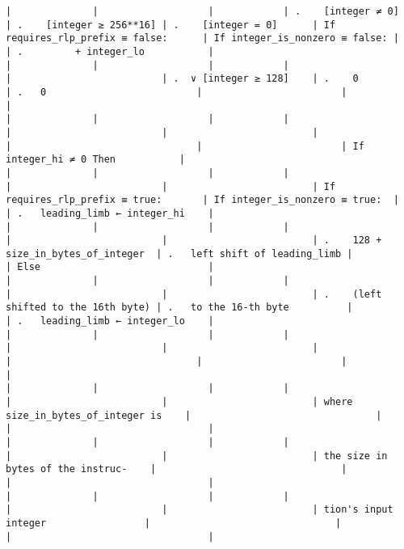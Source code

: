 \documentclass[varwidth=\maxdimen,margin=0.5cm,multi={verbatim}]{standalone}
\begin{document}
\begin{verbatim}
|              |                   |            | .    [integer ≠ 0]      | .    [integer ≥ 256**16] | .    [integer = 0]      | If requires_rlp_prefix ≡ false:      | If integer_is_nonzero ≡ false: |                        | .         + integer_lo           |
|              |                   |            |                         |                          | .  ∨ [integer ≥ 128]    | .    0                               | .   0                          |                        |                                  |
|              |                   |            |                         |                          |                         |                                      |                                |                        | If integer_hi ≠ 0 Then           |
|              |                   |            |                         |                          |                         | If requires_rlp_prefix ≡ true:       | If integer_is_nonzero ≡ true:  |                        | .   leading_limb ← integer_hi    |
|              |                   |            |                         |                          |                         | .    128 + size_in_bytes_of_integer  | .   left shift of leading_limb |                        | Else                             |
|              |                   |            |                         |                          |                         | .    (left shifted to the 16th byte) | .   to the 16-th byte          |                        | .   leading_limb ← integer_lo    |
|              |                   |            |                         |                          |                         |                                      |                                |                        |                                  |
|              |                   |            |                         |                          |                         | where size_in_bytes_of_integer is    |                                |                        |                                  |
|              |                   |            |                         |                          |                         | the size in bytes of the instruc-    |                                |                        |                                  |
|              |                   |            |                         |                          |                         | tion's input integer                 |                                |                        |                                  |

\end{verbatim}
\end{document}

